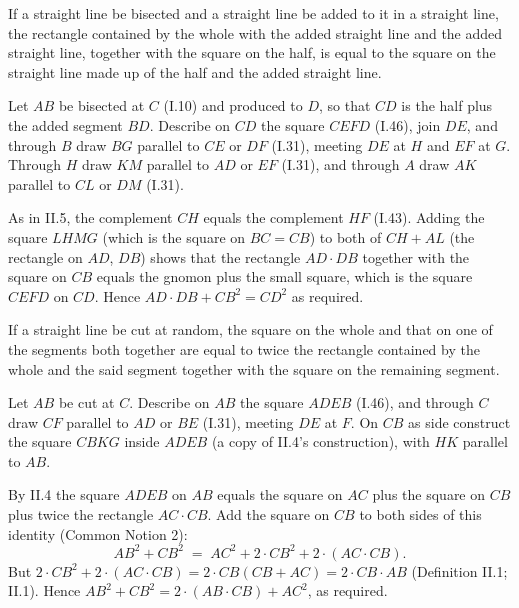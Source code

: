 \documentclass{rrxiv}
\begin{document}
\begin{claim}
\label{prop:II.6}
If a straight line be bisected and a straight line be added to it in
a straight line, the rectangle contained by the whole with the added
straight line and the added straight line, together with the square
on the half, is equal to the square on the straight line made up of
the half and the added straight line.
\end{claim}
\begin{evidence}[Proof of II.6]
\label{ev:II.6}
Let $AB$ be bisected at $C$ (I.10) and produced to $D$, so that $CD$
is the half plus the added segment $BD$.  Describe on $CD$ the
square $CEFD$ (I.46), join $DE$, and through $B$ draw $BG$ parallel
to $CE$ or $DF$ (I.31), meeting $DE$ at $H$ and $EF$ at $G$.
Through $H$ draw $KM$ parallel to $AD$ or $EF$ (I.31), and through
$A$ draw $AK$ parallel to $CL$ or $DM$ (I.31).

As in II.5, the complement $CH$ equals the complement $HF$ (I.43).
Adding the square $LHMG$ (which is the square on $BC = CB$) to both
of $CH + AL$ (the rectangle on $AD$, $DB$) shows that the rectangle
$AD\cdot DB$ together with the square on $CB$ equals the gnomon plus
the small square, which is the square $CEFD$ on $CD$.  Hence
$AD\cdot DB + CB^2 = CD^2$ as required.
\end{evidence}

\begin{claim}
\label{prop:II.7}
If a straight line be cut at random, the square on the whole and that
on one of the segments both together are equal to twice the rectangle
contained by the whole and the said segment together with the square
on the remaining segment.
\end{claim}
\begin{evidence}[Proof of II.7]
\label{ev:II.7}
Let $AB$ be cut at $C$.  Describe on $AB$ the square $ADEB$ (I.46),
and through $C$ draw $CF$ parallel to $AD$ or $BE$ (I.31), meeting
$DE$ at $F$.  On $CB$ as side construct the square $CBKG$ inside
$ADEB$ (a copy of II.4's construction), with $HK$ parallel to $AB$.

By II.4 the square $ADEB$ on $AB$ equals the square on $AC$ plus the
square on $CB$ plus twice the rectangle $AC \cdot CB$.  Add the
square on $CB$ to both sides of this identity (Common Notion 2):
\[
    AB^2 + CB^2 \;=\; AC^2 + 2\cdot CB^2 + 2\cdot(AC\cdot CB).
\]
But $2\cdot CB^2 + 2\cdot(AC\cdot CB) = 2\cdot CB(CB + AC) =
2\cdot CB \cdot AB$ (Definition II.1; II.1).  Hence
$AB^2 + CB^2 = 2\cdot(AB\cdot CB) + AC^2$, as required.
\end{evidence}
\end{document}
